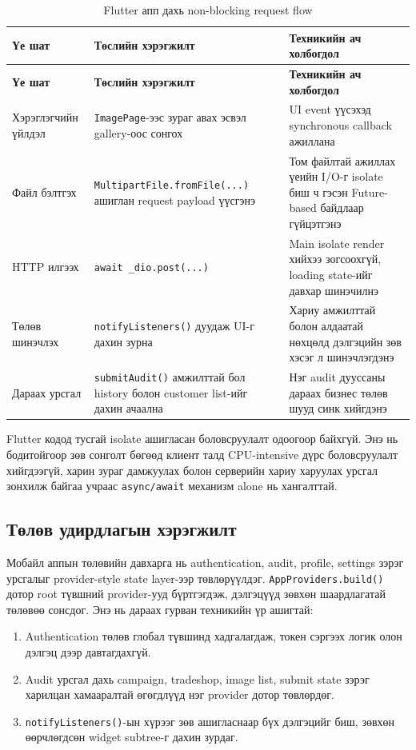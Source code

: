 \begin{longtable}{|p{3.2cm}|p{4.8cm}|p{5.4cm}|}
\caption{Flutter апп дахь non-blocking request flow}
\label{tab:flutter_async_flow} \\
\hline
\textbf{Үе шат} & \textbf{Төслийн хэрэгжилт} & \textbf{Техникийн ач холбогдол} \\
\hline
\endfirsthead
\hline
\textbf{Үе шат} & \textbf{Төслийн хэрэгжилт} & \textbf{Техникийн ач холбогдол} \\
\hline
\endhead
\hline
\endfoot
Хэрэглэгчийн үйлдэл & \texttt{ImagePage}-ээс зураг авах эсвэл gallery-оос сонгох & UI event үүсэхэд synchronous callback ажиллана \\
\hline
Файл бэлтгэх & \texttt{MultipartFile.fromFile(...)} ашиглан request payload үүсгэнэ & Том файлтай ажиллах үеийн I/O-г isolate биш ч гэсэн Future-based байдлаар гүйцэтгэнэ \\
\hline
HTTP илгээх & \texttt{await \_dio.post(...)} & Main isolate render хийхээ зогсоохгүй, loading state-ийг давхар шинэчилнэ \\
\hline
Төлөв шинэчлэх & \texttt{notifyListeners()} дуудаж UI-г дахин зурна & Хариу амжилттай болон алдаатай нөхцөлд дэлгэцийн зөв хэсэг л шинэчлэгдэнэ \\
\hline
Дараах урсгал & \texttt{submitAudit()} амжилттай бол history болон customer list-ийг дахин ачаална & Нэг audit дууссаны дараах бизнес төлөв шууд синк хийгдэнэ \\
\hline
\end{longtable}

Flutter кодод тусгай isolate ашигласан боловсруулалт одоогоор байхгүй. Энэ нь бодитойгоор зөв сонголт бөгөөд клиент талд CPU-intensive дүрс боловсруулалт хийгдээгүй, харин зураг дамжуулах болон серверийн хариу харуулах урсгал зонхилж байгаа учраас \texttt{async/await} механизм alone нь хангалттай.

\subsection{Төлөв удирдлагын хэрэгжилт}

Мобайл аппын төлөвийн давхарга нь authentication, audit, profile, settings зэрэг урсгалыг provider-style state layer-ээр төвлөрүүлдэг. \texttt{AppProviders.build()} дотор root түвшний provider-ууд бүртгэгдэж, дэлгэцүүд зөвхөн шаардлагатай төлөвөө сонсдог. Энэ нь дараах гурван техникийн үр ашигтай:

\begin{enumerate}
    \item Authentication төлөв глобал түвшинд хадгалагдаж, токен сэргээх логик олон дэлгэц дээр давтагдахгүй.
    \item Audit урсгал дахь campaign, tradeshop, image list, submit state зэрэг харилцан хамааралтай өгөгдлүүд нэг provider дотор төвлөрдөг.
    \item \texttt{notifyListeners()}-ын хүрээг зөв ашигласнаар бүх дэлгэцийг биш, зөвхөн өөрчлөгдсөн widget subtree-г дахин зурдаг.
\end{enumerate}

